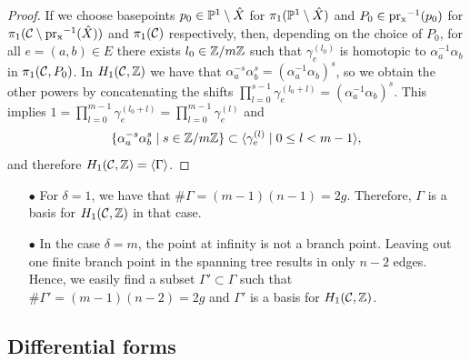 \documentclass[main.tex]{subfiles}
\begin{document}
\begin{proof}
  If we choose basepoints $p_0 \in \P^1 \setminus \hat{X}$ for $\pi_1(\P^1 \setminus \hat{X})$ and $P_0 \in \pr^{-1}(p_0)$ for $\pi_1(\cu \setminus \pr^{-1}(\hat{X}))$ and $\pi_1(\cu)$ respectively, then,
  depending on the choice of $P_0$, for all $e = (a,b) \in E$ there exists $l_0 \in \Z/m\Z$ such that $\gamma_e^{(l_0)}$ is homotopic to $\alpha_a^{-1} \alpha_b$ in $\pi_1(\cu,P_0)$.
   In $\homo$ we have that $\alpha_a^{-s}\alpha_b^{s} = ( \alpha_a^{-1}\alpha_b)^s$, so we obtain the other powers by concatenating
  the shifts $\prod_{l = 0}^{s-1} \gamma_e^{(l_0+l)} = (\alpha_a^{-1}\alpha_b)^s$.
  This implies $1 = \prod_{l = 0}^{m-1} \gamma_e^{(l_0+l)} = \prod_{l = 0}^{m-1} \gamma_e^{(l)}$ and
   $$\{  \alpha_a^{-s} \alpha_b^{s}  \mid  s \in \Z/m\Z  \} \subset  \langle  \gamma_e^{(l)}
  \mid  0 \le l < m-1 \rangle,$$ and therefore $\homo = \langle  \Gamma  \rangle$.
  \end{proof}

  \begin{rmk}
  \begin{itemize}
   \item[$\bullet$] For $\delta = 1$, we have that $\# \Gamma = (m-1)(n-1) = 2g$. Therefore, $\Gamma$ is a basis for $\homo$ in that case.
   \item[$\bullet$] In the case $\delta = m$, the point at infinity is not a branch point. Leaving out one finite branch point in the spanning tree results in only $n-2$ edges. Hence, we easily find a subset
   $\Gamma' \subset \Gamma$ such that
   $\# \Gamma' = (m-1)(n-2) = 2g$ and $\Gamma'$ is a basis for $\homo$.
  \end{itemize}
  \end{rmk}

\subsection{Differential forms}\label{subsec:diff_forms}
\end{document}
